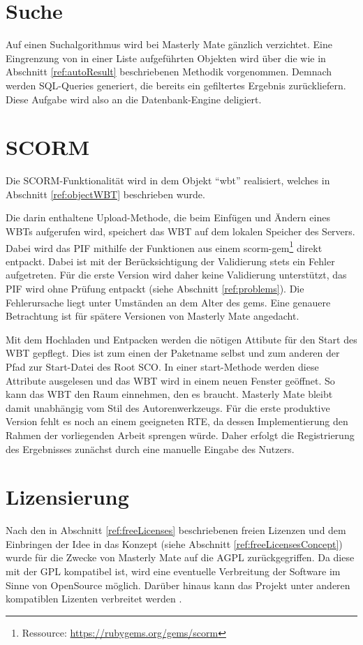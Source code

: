 \section{Suche}
Auf einen Suchalgorithmus wird bei Masterly Mate gänzlich verzichtet. Eine
Eingrenzung von in einer Liste aufgeführten Objekten wird über die wie in
Abschnitt \ref{ref:autoResult} beschriebenen Methodik vorgenommen. Demnach
werden \ac{SQL}-Queries generiert, die bereits ein gefiltertes Ergebnis
zurückliefern. Diese Aufgabe wird also an die Datenbank-Engine deligiert.

\section{SCORM}\label{ref:implSCORM}
Die SCORM-Funktionalität wird in dem Objekt "`wbt"' realisiert, welches in
Abschnitt \ref{ref:objectWBT} beschrieben wurde. 

Die darin enthaltene Upload-Methode, die beim Einfügen und Ändern eines WBTs
aufgerufen wird, speichert das WBT auf dem lokalen Speicher des Servers. Dabei
wird das \ac{PIF} mithilfe der Funktionen aus einem
scorm-gem\footnote{Ressource: \url{https://rubygems.org/gems/scorm}} direkt
entpackt. Dabei ist mit der Berücksichtigung der Validierung stets ein Fehler
aufgetreten. Für die erste Version wird daher keine Validierung unterstützt, das
PIF wird ohne Prüfung entpackt (siehe Abschnitt \ref{ref:problems}). Die
Fehlerursache liegt unter Umständen an dem Alter des gems. Eine genauere Betrachtung ist für
spätere Versionen von Masterly Mate angedacht. 

Mit dem Hochladen und Entpacken werden die nötigen Attibute für den Start des
WBT gepflegt. Dies ist zum einen der Paketname selbst und zum anderen der Pfad
zur Start-Datei des Root SCO. In einer start-Methode werden diese Attribute
ausgelesen und das WBT wird in einem neuen Fenster geöffnet. So kann das WBT den
Raum einnehmen, den es braucht. Masterly Mate bleibt damit unabhängig vom Stil
des Autorenwerkzeugs. Für die erste produktive Version fehlt es noch an einem
geeigneten RTE, da dessen Implementierung den Rahmen der vorliegenden Arbeit
sprengen würde. Daher erfolgt die Registrierung des Ergebnisses zunächst durch
eine manuelle Eingabe des Nutzers.

\section{Lizensierung}
Nach den in Abschnitt \ref{ref:freeLicenses} beschriebenen freien Lizenzen und
dem Einbringen der Idee in das Konzept (siehe Abschnitt
\ref{ref:freeLicensesConcept}) wurde für die Zwecke von Masterly Mate auf die
\ac{AGPL} zurückgegriffen. Da diese mit der \ac{GPL} kompatibel ist, wird
eine eventuelle Verbreitung der Software im Sinne von OpenSource möglich.
Darüber hinaus kann das Projekt unter anderen kompatiblen Lizenten verbreitet
werden \cite{fsf:2007}.

